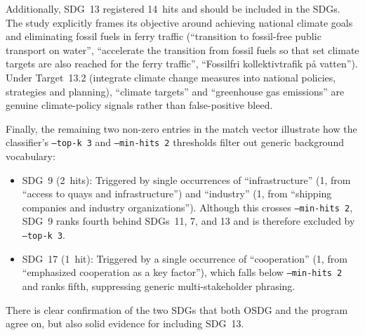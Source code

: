 \begin{casestudySection}
Additionally, \gls{SDG}~13 registered \num{14}~hits and should be included in the \glspl{SDG}. The study explicitly frames its objective around achieving national climate goals and eliminating fossil fuels in ferry traffic (\enquote{transition to fossil-free public transport on water}, \enquote{accelerate the transition from fossil fuels so that set climate targets are also reached for the ferry traffic}, \enquote{\foreignlanguage{swedish}{Fossilfri kollektivtrafik på vatten}}). Under Target~13.2 (integrate climate change measures into national policies, strategies and planning), \enquote{climate targets} and \enquote{greenhouse gas emissions} are genuine climate-policy signals rather than false-positive bleed.

Finally, the remaining two non-zero entries in the match vector illustrate how the classifier's \texttt{--top-k 3} and \texttt{--min-hits 2} thresholds filter out generic background vocabulary:
\begin{itemize}
    \item \gls{SDG}~9 (\num{2}~hits): Triggered by single occurrences of \enquote{infrastructure} (\num{1}, from \enquote{access to quays and infrastructure}) and \enquote{industry} (\num{1}, from \enquote{shipping companies and industry organizations}). Although this crosses \texttt{--min-hits 2}, \gls{SDG}~9 ranks fourth behind \glspl{SDG}~11, 7, and 13 and is therefore excluded by \texttt{--top-k 3}.

    \item \gls{SDG}~17 (\num{1}~hit): Triggered by a single occurrence of \enquote{cooperation} (\num{1}, from \enquote{emphasized cooperation as a key factor}), which falls below \texttt{--min-hits 2} and ranks fifth, suppressing generic multi-stakeholder phrasing.
\end{itemize}
\end{casestudySection}

\begin{takeaway}
There is clear confirmation of the two \glspl{SDG} that both OSDG and the program agree on, but also solid evidence for including \gls{SDG}~13.
\end{takeaway}

